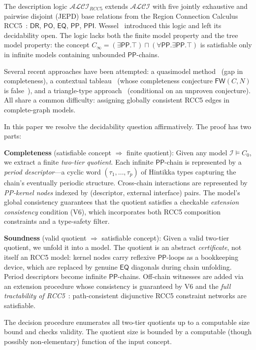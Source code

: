 \documentclass[a4paper,11pt]{article}
\theoremstyle{definition}
\newcommand{\ALCI}{\ensuremath{\mathcal{ALCI}}}
\newcommand{\ALCIRCC}[1]{\ensuremath{\mathcal{ALCI}_{\mathit{RCC#1}}}}
\newcommand{\DR}{\ensuremath{\mathsf{DR}}}
\newcommand{\PO}{\ensuremath{\mathsf{PO}}}
\newcommand{\EQ}{\ensuremath{\mathsf{EQ}}}
\newcommand{\PP}{\ensuremath{\mathsf{PP}}}
\newcommand{\PPI}{\ensuremath{\mathsf{PPI}}}
\newcommand{\interp}{\ensuremath{\mathcal{I}}}
\begin{document}
The description logic $\ALCIRCC{5}$ extends $\ALCI$ with five jointly
exhaustive and pairwise disjoint (JEPD) base relations from the
Region Connection Calculus RCC5~\cite{RandellCuiCohn1992}: $\DR$,
$\PO$, $\EQ$, $\PP$, $\PPI$.  Wessel~\cite{Wessel2003} introduced
this logic and left its decidability open.  The logic lacks both the
finite model property and the tree model property: the concept
$C_\infty = (\exists\PP.\top) \sqcap (\forall\PP.\exists\PP.\top)$ is
satisfiable only in infinite models containing unbounded $\PP$-chains.

Several recent approaches have been attempted:
a quasimodel method~\cite{Claude2026} (gap in completeness),
a contextual tableau~\cite{GPT2026} (whose completeness conjecture
$\mathsf{FW}(C,N)$ is false~\cite{ClaudeFW2026}), and a
triangle-type approach~\cite{ClaudeTriangle2026} (conditional on an
unproven conjecture).  All share a common difficulty: assigning
globally consistent RCC5 edges in complete-graph models.

In this paper we resolve the decidability question affirmatively.
The proof has two parts:

\textbf{Completeness} (satisfiable concept $\Rightarrow$ finite
quotient): Given any model $\interp \models C_0$, we extract a
finite \emph{two-tier quotient}.  Each infinite $\PP$-chain is
represented by a \emph{period descriptor}---a cyclic word
$(\tau_1, \ldots, \tau_p)$ of Hintikka types capturing the chain's
eventually periodic structure.  Cross-chain interactions are
represented by \emph{PP-kernel nodes} indexed by (descriptor, external
interface) pairs.  The model's global
consistency guarantees that the quotient satisfies a checkable
\emph{extension consistency} condition (V6), which incorporates both
RCC5 composition constraints and a type-safety filter.

\textbf{Soundness} (valid quotient $\Rightarrow$ satisfiable
concept): Given a valid two-tier quotient, we unfold it into a
model.  The quotient is an abstract \emph{certificate}, not itself
an RCC5 model: kernel nodes carry reflexive $\PP$-loops as a
bookkeeping device, which are replaced by genuine $\EQ$ diagonals
during chain unfolding.  Period descriptors become infinite $\PP$-chains.
Off-chain witnesses are added via an extension procedure whose
consistency is guaranteed by V6 and the \emph{full tractability of
RCC5}~\cite{RenzNebel1999}: path-consistent disjunctive RCC5
constraint networks are satisfiable.

The decision procedure enumerates all two-tier quotients up to a
computable size bound and checks validity.  The quotient size is
bounded by a computable (though possibly non-elementary) function of
the input concept.
\end{document}
